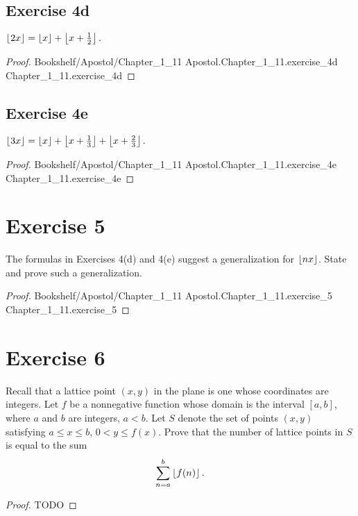 \documentclass{article}
\newcommand{\link}[1]{\lean{../..}
  {Bookshelf/Apostol/Chapter\_1\_11}
  {Apostol.Chapter\_1\_11.#1}
  {Chapter\_1\_11.#1}
}
\begin{document}
\subsection{Exercise 4d}%
\label{sub:exercise-4d}

$\left\lfloor2x\right\rfloor = \left\lfloor x\right\rfloor + \left\lfloor x + \frac{1}{2}\right\rfloor.$

\begin{proof}

  \link{exercise\_4d}

\end{proof}

\subsection{Exercise 4e}%
\label{sub:exercise-4e}

$\left\lfloor3x\right\rfloor = \left\lfloor x\right\rfloor + \left\lfloor x + \frac{1}{3}\right\rfloor + \left\lfloor x + \frac{2}{3}\right\rfloor.$

\begin{proof}

  \link{exercise\_4e}

\end{proof}

\section{Exercise 5}%
\label{sec:exercise-5}

The formulas in Exercises 4(d) and 4(e) suggest a generalization for
  $\left\lfloor nx\right\rfloor$.
State and prove such a generalization.

\begin{proof}

  \link{exercise\_5}

\end{proof}

\section{Exercise 6}%
\label{sec:exercise-6}

Recall that a lattice point $(x, y)$ in the plane is one whose coordinates are
  integers.
Let $f$ be a nonnegative function whose domain is the interval $[a, b]$, where
  $a$ and $b$ are integers, $a < b$.
Let $S$ denote the set of points $(x, y)$ satisfying $a \leq x \leq b$,
  $0 < y \leq f(x)$.
Prove that the number of lattice points in $S$ is equal to the sum
  $$\sum_{n=a}^b \left\lfloor f(n)\right\rfloor.$$

\begin{proof}

  TODO

\end{proof}
\end{document}
